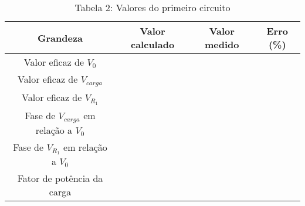 \vspace{5pt}
\begin{table}[h]
\centering
\begin{tabular}{|c|c|c|c|}
\hline
\textbf{Grandeza} & \textbf{Valor calculado} & \textbf{Valor medido} & \textbf{Erro (\%) }\\\hline
Valor eficaz de $V_0$ & & & \\\hline
Valor eficaz de $V_{carga}$ & & & \\\hline
Valor eficaz de $V_{R_1}$ & & & \\\hline
Fase de $V_{carga}$ em relação a $V_0$ & & & \\\hline
Fase de $V_{R_1}$ em relação a $V_0$ & & & \\\hline
Fator de potência da carga & & & \\\hline
\end{tabular}
\caption*{Tabela 2: Valores do primeiro circuito}
\end{table}